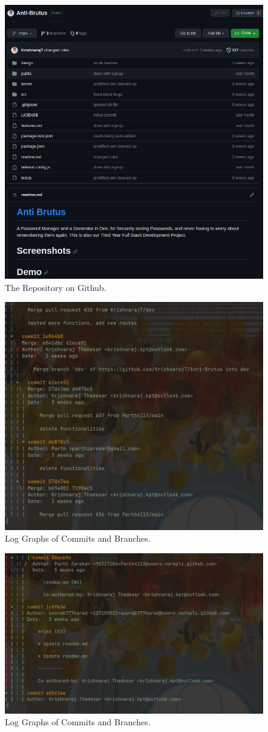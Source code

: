 \documentclass[11pt]{article}
\begin{document}
\begin{figure}[H]
    \centering
    \includegraphics[width=.85\textwidth]{7.png}
    \caption{The Repository on Github.}
\end{figure}

\begin{figure}[H]
    \centering
    \includegraphics[width=.75\textwidth]{2.png}
    \caption{Log Graphs of Commits and Branches.}
\end{figure}

\begin{figure}[H]
    \centering
    \includegraphics[width=.85\textwidth]{4.png}
    \caption{Log Graphs of Commits and Branches.}
\end{figure}
\end{document}
